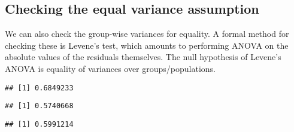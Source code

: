 \documentclass[
]{book}
\newenvironment{Shaded}{\begin{snugshade}}{\end{snugshade}}
\newcommand{\DecValTok}[1]{\textcolor[rgb]{0.00,0.00,0.81}{#1}}
\newcommand{\FunctionTok}[1]{\textcolor[rgb]{0.00,0.00,0.00}{#1}}
\newcommand{\NormalTok}[1]{#1}
\newcommand{\SpecialCharTok}[1]{\textcolor[rgb]{0.00,0.00,0.00}{#1}}
\begin{document}
\hypertarget{checking-the-equal-variance-assumption}{%
\subsection{Checking the equal variance assumption}\label{checking-the-equal-variance-assumption}}

We can also check the group-wise variances for equality. A formal method for checking these is Levene's test, which amounts to performing ANOVA on the absolute values of the residuals themselves. The null hypothesis of Levene's ANOVA is equality of variances over groups/populations.

\begin{Shaded}
\end{Shaded}

\begin{verbatim}
## [1] 0.6849233
\end{verbatim}

\begin{Shaded}
\end{Shaded}

\begin{verbatim}
## [1] 0.5740668
\end{verbatim}

\begin{Shaded}
\end{Shaded}

\begin{verbatim}
## [1] 0.5991214
\end{verbatim}
\end{document}
